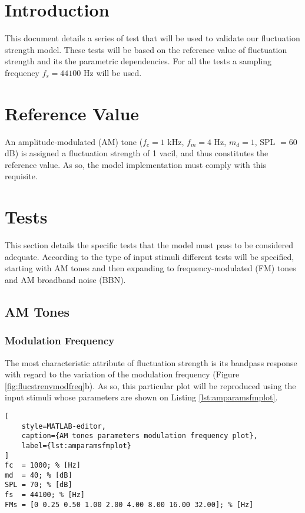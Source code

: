\documentclass[a4paper]{article}
\begin{document}

\section{Introduction}

This document details a series of test that will be used to validate our
fluctuation strength model. These tests will be based on the reference value of
fluctuation strength and its the parametric dependencies. For all the tests a
sampling frequency $f_s = 44100 $ Hz will be used.

\section{Reference Value}

An amplitude-modulated (AM) tone ($f_c = 1$ kHz, $f_m = 4$ Hz, $m_d = 1$,
SPL $=60$ dB) is assigned a fluctuation strength of 1 vacil, and thus
constitutes the reference value. As so, the model implementation must comply
with this requisite.

\section{Tests}

This section details the specific tests that the model must pass to be
considered adequate. According to the type of input stimuli different tests
will be specified, starting with AM tones and then expanding to
frequency-modulated (FM) tones and AM broadband noise (BBN).

\subsection{AM Tones}

\subsubsection{Modulation Frequency}

The most characteristic attribute of fluctuation strength is its bandpass
response with regard to the variation of the modulation frequency (Figure
\ref{fig:flucstrenvmodfreq}b). As so, this particular plot will be reproduced
using the input stimuli whose parameters are shown on Listing
\ref{lst:amparamsfmplot}.

\begin{lstlisting}[
    style=MATLAB-editor,
    caption={AM tones parameters modulation frequency plot},
    label={lst:amparamsfmplot}
]
fc  = 1000; % [Hz]
md  = 40; % [dB]
SPL = 70; % [dB]
fs  = 44100; % [Hz]
FMs = [0 0.25 0.50 1.00 2.00 4.00 8.00 16.00 32.00]; % [Hz]
\end{lstlisting}
\end{document}
